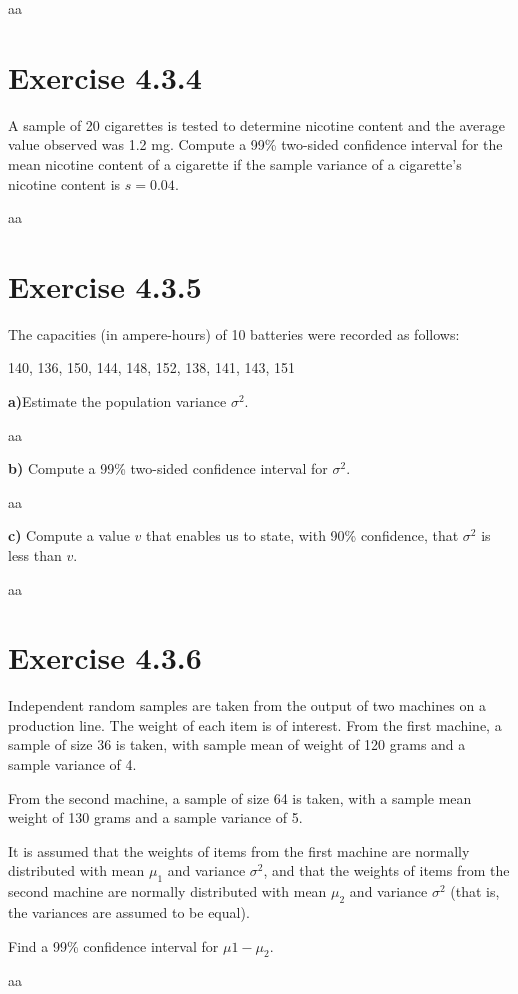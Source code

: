 \documentclass[titlepage, letterpaper, fleqn]{article}
\newcommand{\spacepls}{\vspace{5mm}}
\begin{document}
aa

\spacepls

\section{Exercise 4.3.4}

{\large A sample of 20 cigarettes is tested to determine nicotine content and the average value observed was 1.2 mg.
Compute a 99\% two-sided confidence interval for the mean nicotine content of a cigarette if the sample variance of a cigarette's nicotine content is $s=0.04$.}

aa

\spacepls

\section{Exercise 4.3.5}

{\large The capacities (in ampere-hours) of 10 batteries were recorded as follows:

140, 136, 150, 144, 148, 152, 138, 141, 143, 151

\textbf{a)}Estimate the population variance $\sigma^2$.}

aa

\spacepls

{\large \textbf{b)} Compute a 99\% two-sided confidence interval for $\sigma^2$.}

aa

\spacepls

{\large \textbf{c)} Compute a value $v$ that enables us to state, with 90\% confidence, that $\sigma^2$ is less than $v$.}

aa

\spacepls

\section{Exercise 4.3.6}

{\large Independent random samples are taken from the output of two machines on a production line.
The weight of each item is of interest.
From the first machine, a sample of size 36 is taken, with sample mean of weight of 120 grams and a sample variance of 4.

From the second machine, a sample of size 64 is taken, with a sample mean weight of 130 grams and a sample variance of 5.

It is assumed that the weights of items from the first machine are normally distributed with mean $\mu_1$ and variance $\sigma^2$, and that the weights of items from the second machine are normally distributed with mean $\mu_2$ and variance $\sigma^2$ (that is, the variances are assumed to be equal).

Find a 99\% confidence interval for $\mu1 - \mu_2$.}

aa
\end{document}
